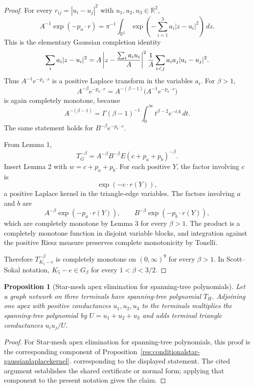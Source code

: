 \documentclass[11pt]{article}
\numberwithin{equation}{section}
\newtheorem{proposition}[theorem]{Proposition}
\theoremstyle{definition}
\theoremstyle{remark}
\newcommand{\1}{\mathbf 1}
\begin{document}
\begin{proof}
For every \(r_{ij}=|u_i-u_j|^2\) with \(u_1,u_2,u_3\in\mathbb R^2\),
\[
A^{-1}\exp(-p_a\cdot r)
=\pi^{-1}\int_{\mathbb R^2}
\exp\left(-\sum_{i=1}^3 a_i|z-u_i|^2\right)\,dz.
\]
This is the elementary Gaussian completion identity
\[
\sum_i a_i|z-u_i|^2
=A\left|z-\frac{\sum_i a_iu_i}{A}\right|^2
{1\over A}\sum_{i<j}a_ia_j|u_i-u_j|^2 .
\]
Thus \(A^{-1}e^{-p_a\cdot r}\) is a positive Laplace transform in the variables \(a_i\). For \(\beta>1\),
\[
A^{-\beta}e^{-p_a\cdot r}
=A^{-(\beta-1)}\big(A^{-1}e^{-p_a\cdot r}\big)
\]
is again completely monotone, because
\[
A^{-(\beta-1)}
=\Gamma(\beta-1)^{-1}\int_0^\infty t^{\beta-2}e^{-tA}\,dt.
\]
The same statement holds for \(B^{-\beta}e^{-p_b\cdot r}\).

From Lemma 1,
\[
T_G^{-\beta}=A^{-\beta}B^{-\beta}E(c+p_a+p_b)^{-\beta}.
\]
Insert Lemma 2 with \(w=c+p_a+p_b\). For each positive \(Y\), the factor involving \(c\) is
\[
\exp(-c\cdot r(Y)),
\]
a positive Laplace kernel in the triangle-edge variables. The factors involving \(a\) and \(b\) are
\[
A^{-\beta}\exp(-p_a\cdot r(Y)),
\qquad
B^{-\beta}\exp(-p_b\cdot r(Y)),
\]
which are completely monotone by Lemma 3 for every \(\beta>1\). The product is a completely monotone function in disjoint variable blocks, and integration against the positive Riesz measure preserves complete monotonicity by Tonelli.

Therefore \(T_{K_5-e}^{-\beta}\) is completely monotone on \((0,\infty)^9\) for every \(\beta>1\). In Scott--Sokal notation, \(K_5-e\in G_\beta\) for every \(1<\beta<3/2\).
\end{proof}

\begin{proposition}[Star-mesh apex elimination for spanning-tree polynomials]
\label{res:starmesh-spanningtree-apexelimination}
Let a graph network on three terminals have spanning-tree polynomial \(T_H\). Adjoining one apex with positive conductances \(u_1,u_2,u_3\) to the terminals multiplies the spanning-tree polynomial by \(U=u_1+u_2+u_3\) and adds terminal triangle conductances \(u_iu_j/U\).
\end{proposition}

\begin{proof}
For Star-mesh apex elimination for spanning-tree polynomials, this proof is the corresponding component of Proposition~\ref{res:conditionalstar-gaussianlaplacekernel}.  corresponding to the displayed statement.  The cited argument establishes the shared certificate or normal form; applying that component to the present notation gives the claim.
\end{proof}
\end{document}
